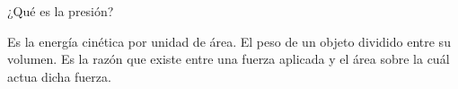 
\question ¿Qué es la presión?

  \begin{choices}
    \choice Es la energía cinética por unidad de área.
    \choice El peso de un objeto dividido entre su volumen.
    \CorrectChoice Es la razón que existe entre una fuerza aplicada y el
            área sobre la cuál actua dicha fuerza.
  \end{choices}
